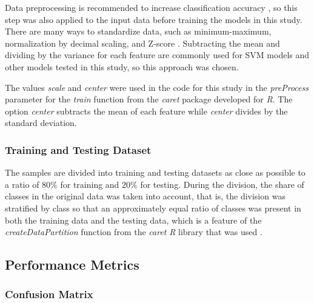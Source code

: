 \documentclass[sn-mathphys-num]{sn-jnl}%
\begin{document}
Data preprocessing is recommended to increase classification accuracy \cite{Fan2008}, so this step was also applied to the input data before training the models in this study. There are many ways to standardize data, such as minimum-maximum, normalization by decimal scaling, and Z-score \cite{Mohamad2013}. Subtracting the mean and dividing by the variance for each feature are commonly used for SVM models \cite{Fennell2019} and other models tested in this study, so this approach was chosen. 

The values \textit{scale} and \textit{center} were used in the code for this study in the \textit{preProcess} parameter for the \textit{train} function from the \textit{caret} package developed for \textit{R}. The option \textit{center} subtracts the mean of each feature while \textit{center} divides by the standard deviation. 

\subsubsection{Training and Testing Dataset}

The samples are divided into training and testing datasets as close as possible to a ratio of $80\%$ for training and $20\%$ for testing. During the division, the share of classes in the original data was taken into account, that is, the division was stratified by class so that an approximately equal ratio of classes was present in both the training data and the testing data, which is a feature of the \textit{createDataPartition} function from the \textit{caret} \textit{R} library that was used \cite{KuhnDataSplitting2024, hyndman2018forecasting, createDataPartition2024}.

\subsection{Performance Metrics}

\subsubsection{Confusion Matrix}
\end{document}
